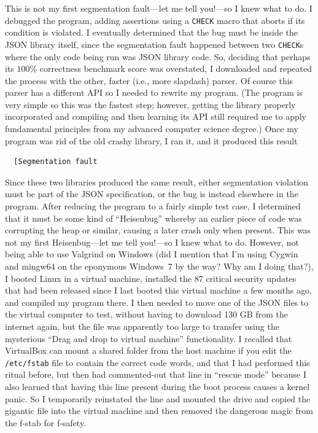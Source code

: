 \documentclass[twocolumn]{article}
\begin{document}
This is not my first segmentation fault---let me tell you!---so I knew
what to do. I debugged the program, adding assertions using a
\verb+CHECK+ macro that aborts if its condition is violated. I
eventually determined that the bug must be inside the JSON library
itself, since the segmentation fault happened between two
\verb+CHECK+s where the only code being run was JSON library code. So,
deciding that perhaps its $100\%$ correctness benchmark score was
overstated, I downloaded and repeated the process with the other,
faster (i.e., more slapdash) parser. Of course this parser has a
different API so I needed to rewrite my program. (The program is very
simple so this was the fastest step; however, getting the library
properly incorporated and compiling and then learning its API still
required me to apply fundamental principles from my advanced computer
science degree.) Once my program was rid of the old crashy library, I
ran it, and it produced this result
\begin{verbatim}
  [Segmentation fault
\end{verbatim}
Since these two libraries produced the same result, either
segmentation violation must be part of the JSON specification, or the
bug is instead elsewhere in the program. After reducing the program to
a fairly simple test case, I determined that it must be some kind of
``Heisenbug'' whereby an earlier piece of code was corrupting the heap
or similar, causing a later crash only when present. This was not my
first Heisenbug---let me tell you!---so I knew what to do. However,
not being able to use Valgrind on Windows (did I mention that I'm
using Cygwin and mingw64 on the eponymous Windows~7 by the way? Why am
I doing that?), I booted Linux in a virtual machine, installed the 87
critical security updates that had been released since I last booted
this virtual machine a few months ago, and compiled my program there.
I then needed to move one of the JSON files to the virtual computer to
test, without having to download 130 GB from the internet again, but
the file was apparently too large to transfer using the mysterious
``Drag and drop to virtual machine'' functionality. I recalled that
VirtualBox can mount a shared folder from the host machine if you edit
the \verb+/etc/fstab+ file to contain the correct code words, and that
I had performed this ritual before, but then had commented-out that
line in ``rescue mode'' because I also learned that having this line
present during the boot process causes a kernel panic. So I
temporarily reinstated the line and mounted the drive and copied the
gigantic file into the virtual machine and then removed the dangerous
magic from the f-stab for f-safety.
\end{document}
